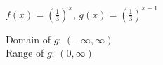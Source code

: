 {$f(x) = \left(\frac{1}{3}\right)^{x}$, $g(x) = \left(\frac{1}{3}\right)^{x-1}$}
{Domain of $g$:  $(-\infty, \infty)$ \\
 Range of $g$:  $(0, \infty)$ \\
 
\begin{center}
\end{center}}

